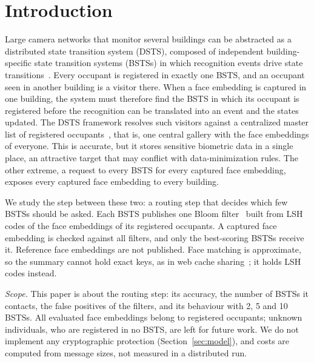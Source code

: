 \documentclass[pdflatex,sn-mathphys-num]{sn-jnl}%
\theoremstyle{thmstyleone}%
\theoremstyle{thmstyletwo}%
\theoremstyle{thmstylethree}%
\begin{document}

\maketitle

\section{Introduction}\label{sec1}

Large camera networks that monitor several buildings can be abstracted as a distributed state transition system (DSTS), composed of independent building-specific state transition systems (BSTSs) in which recognition events drive state transitions~\cite{mohan2020}. Every occupant is registered in exactly one BSTS, and an occupant seen in another building is a visitor there. When a face embedding is captured in one building, the system must therefore find the BSTS in which its occupant is registered before the recognition can be translated into an event and the states updated. The DSTS framework resolves such visitors against a centralized master list of registered occupants~\cite{mohan2020}, that is, one central gallery with the face embeddings of everyone. This is accurate, but it stores sensitive biometric data in a single place, an attractive target that may conflict with data-minimization rules. The other extreme, a request to every BSTS for every captured face embedding, exposes every captured face embedding to every building.

We study the step between these two: a routing step that decides which few BSTSs should be asked. Each BSTS publishes one Bloom filter~\cite{bloom1970} built from LSH codes of the face embeddings of its registered occupants. A captured face embedding is checked against all filters, and only the best-scoring BSTSs receive it. Reference face embeddings are not published. Face matching is approximate, so the summary cannot hold exact keys, as in web cache sharing~\cite{fan2000}; it holds LSH codes instead.

\emph{Scope.} This paper is about the routing step: its accuracy, the number of BSTSs it contacts, the false positives of the filters, and its behaviour with 2, 5 and 10 BSTSs. All evaluated face embeddings belong to registered occupants; unknown individuals, who are registered in no BSTS, are left for future work. We do not implement any cryptographic protection (Section~\ref{sec:model}), and costs are computed from message sizes, not measured in a distributed run.
\end{document}
